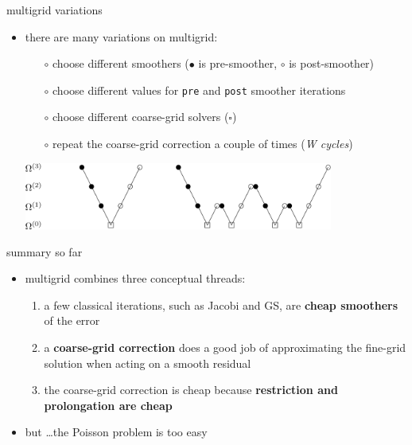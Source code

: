 \documentclass[10pt,
               svgnames,
               hyperref={colorlinks,citecolor=DeepPink4,linkcolor=FireBrick,urlcolor=Maroon},
               usepdftitle=false]{beamer}
\begin{document}
\begin{frame}{multigrid variations}
\begin{itemize}
\item there are many variations on multigrid:
	\begin{itemize}
	\item[$\circ$] choose different smoothers ({\large $\bullet$} is pre-smoother, {\large $\circ$} is post-smoother)
	\item[$\circ$] choose different values for \texttt{pre} and \texttt{post} smoother iterations
	\item[$\circ$] choose different coarse-grid solvers ($\square$)
	\item[$\circ$] repeat the coarse-grid correction a couple of times (\emph{W cycles})
	\end{itemize}

\bigskip\bigskip
\hfill \includegraphics[width=0.8\textwidth]{images/multigrid-cycles.png}
\end{itemize}
\end{frame}


\begin{frame}{summary so far}
\begin{itemize}
\item multigrid combines three conceptual threads:
\begin{enumerate}
\item a few classical iterations, such as Jacobi and GS, are \textbf{cheap smoothers} of the error
\item a \textbf{coarse-grid correction} does a good job of approximating the fine-grid solution when acting on a smooth residual
\item the coarse-grid correction is cheap because \textbf{restriction and prolongation are cheap}
\end{enumerate}

\bigskip
\item<2> but \dots the Poisson problem is too easy
\end{itemize}
\end{frame}
\end{document}
